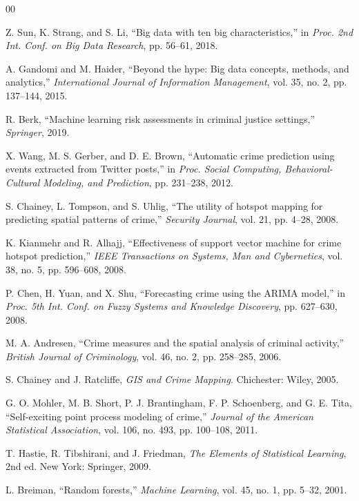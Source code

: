 \documentclass[conference]{IEEEtran}
\begin{document}
\begin{thebibliography}{00}

 Z. Sun, K. Strang, and S. Li, ``Big data with ten big characteristics,'' in \textit{Proc. 2nd Int. Conf. on Big Data Research}, pp. 56--61, 2018.

 A. Gandomi and M. Haider, ``Beyond the hype: Big data concepts, methods, and analytics,'' \textit{International Journal of Information Management}, vol. 35, no. 2, pp. 137--144, 2015.

 R. Berk, ``Machine learning risk assessments in criminal justice settings,'' \textit{Springer}, 2019.

 X. Wang, M. S. Gerber, and D. E. Brown, ``Automatic crime prediction using events extracted from Twitter posts,'' in \textit{Proc. Social Computing, Behavioral-Cultural Modeling, and Prediction}, pp. 231--238, 2012.

 S. Chainey, L. Tompson, and S. Uhlig, ``The utility of hotspot mapping for predicting spatial patterns of crime,'' \textit{Security Journal}, vol. 21, pp. 4--28, 2008.

 K. Kianmehr and R. Alhajj, ``Effectiveness of support vector machine for crime hotspot prediction,'' \textit{IEEE Transactions on Systems, Man and Cybernetics}, vol. 38, no. 5, pp. 596--608, 2008.

 P. Chen, H. Yuan, and X. Shu, ``Forecasting crime using the ARIMA model,'' in \textit{Proc. 5th Int. Conf. on Fuzzy Systems and Knowledge Discovery}, pp. 627--630, 2008.

 M. A. Andresen, ``Crime measures and the spatial analysis of criminal activity,'' \textit{British Journal of Criminology}, vol. 46, no. 2, pp. 258--285, 2006.

 S. Chainey and J. Ratcliffe, \textit{GIS and Crime Mapping}. Chichester: Wiley, 2005.

 G. O. Mohler, M. B. Short, P. J. Brantingham, F. P. Schoenberg, and G. E. Tita, ``Self-exciting point process modeling of crime,'' \textit{Journal of the American Statistical Association}, vol. 106, no. 493, pp. 100--108, 2011.

 T. Hastie, R. Tibshirani, and J. Friedman, \textit{The Elements of Statistical Learning}, 2nd ed. New York: Springer, 2009.

 L. Breiman, ``Random forests,'' \textit{Machine Learning}, vol. 45, no. 1, pp. 5--32, 2001.


\end{thebibliography}
\end{document}
